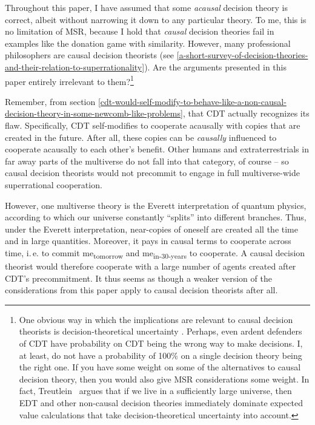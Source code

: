 Throughout this paper, I have assumed that some \emph{acausal} decision
theory is correct, albeit without narrowing it down to any particular
theory. To me, this is no limitation of MSR, because I hold that
\emph{causal} decision theories fail in examples like the donation game
with similarity. However, many professional philosophers are causal
decision theorists (see
\ref{a-short-survey-of-decision-theories-and-their-relation-to-superrationality}). Are the arguments presented in this paper
entirely irrelevant to them?\footnote{One obvious way in which the
  implications are relevant to causal decision theorists is
  decision-theoretical uncertainty
  \parencite{MacAskill2016-zo}. Perhaps, even ardent
  defenders of CDT have probability on CDT being the wrong way to make
  decisions. I, at least, do not have a probability of 100\% on a single
  decision theory being the right one. If you have some weight on some
  of the alternatives to causal decision theory, then you would also
  give MSR considerations some weight. In fact, Treutlein~\citeyear{Treutlein2017} 
  argues that if we live in a sufficiently large universe,
  then EDT and other non-causal decision theories immediately dominate
  expected value calculations that take decision-theoretical uncertainty
  into account.}

Remember, from section
\ref{cdt-would-self-modify-to-behave-like-a-non-causal-decision-theory-in-some-newcomb-like-problems}, that CDT actually recognizes its flaw. Specifically,
CDT self-modifies to cooperate acausally with copies that are created in
the future. After all, these copies can be \emph{causally} influenced to
cooperate acausally to each other's benefit. Other humans and
extraterrestrials in far away parts of the multiverse do not fall into
that category, of course -- so causal decision theorists would not
precommit to engage in full multiverse-wide superrational cooperation.

However, one multiverse theory is the Everett interpretation of quantum
physics, according to which our universe constantly ``splits'' into
different branches. Thus, under the Everett interpretation, near-copies
of oneself are created all the time and in large quantities. Moreover, it pays in causal terms to cooperate across time, i.\,e. to
commit me\textsubscript{tomorrow} and me\textsubscript{in-30-years} to
cooperate. A causal decision theorist would therefore cooperate with a
large number of agents created after CDT's precommitment. It thus seems
as though a weaker version of the considerations from this paper apply
to causal decision theorists after all.

